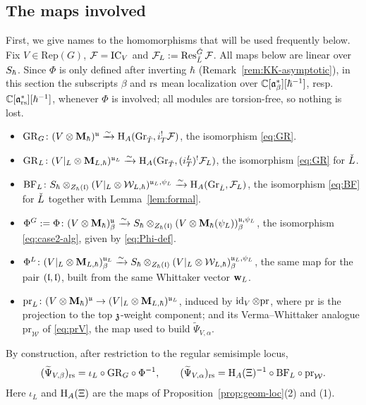 \documentclass{article}
\theoremstyle{plain}
\theoremstyle{definition}
\theoremstyle{remark}
\numberwithin{equation}{section}
\begin{document}
\subsection{The maps involved}\label{sec:cmp-maps}
First, we give names to the homomorphisms that will be used frequently below. Fix $V \in \mathrm{Rep}(G)$, $\mathcal{F}=\operatorname{IC}_V$ and $\mathcal{F}_L:=\operatorname{Res}^{{\check{G}}}_{\check{L}}\mathcal{F}$. All maps below are linear over $S_\hbar$. Since $\Phi$ is only defined after inverting $\hbar$ (Remark~\ref{rem:KK-asymptotic}), in this section the subscripts $\beta$ and $\mathrm{rs}$ mean localization over $\mathbb{C}[\mathfrak{a}^*_{\beta}][\hbar^{-1}]$, resp.\ $\mathbb{C}[\mathfrak{a}^*_{\mathrm{rs}}][\hbar^{-1}]$, whenever $\Phi$ is involved; all modules are torsion-free, so nothing is lost.
\begin{itemize}
\item $\mathrm{GR}_G\colon(V\otimes\mathbf{M}_\hbar)^{\mathfrak{u}}\xrightarrow{\sim}\mathrm{H}_A(\operatorname{Gr}_{{\check{T}}},i_T^!\mathcal{F})$, the isomorphism \eqref{eq:GR}.
\item $\mathrm{GR}_L\colon(V|_L\otimes\mathbf{M}_{L,\hbar})^{\mathfrak{u}_L}\xrightarrow{\sim}\mathrm{H}_A(\operatorname{Gr}_{{\check{T}}},(i^L_T)^!\mathcal{F}_L)$, the isomorphism \eqref{eq:GR} for $\check{L}$.
\item $\mathrm{BF}_L\colon S_\hbar\otimes_{Z_\hbar(\mathfrak{l})}(V|_L\otimes\mathcal{W}_{L,\hbar})^{\mathfrak{u}_L,\psi_L}\xrightarrow{\sim}\mathrm{H}_A(\operatorname{Gr}_{\check{L}},\mathcal{F}_L)$, the isomorphism \eqref{eq:BF} for $\check{L}$ together with Lemma~\ref{lem:formal}.
\item $\Phi^G:=\Phi\colon(V\otimes\mathbf{M}_\hbar)^{\mathfrak{u}}_\beta\xrightarrow{\sim}S_\hbar\otimes_{Z_\hbar(\mathfrak{l})}(V\otimes\mathbf{M}_\hbar(\psi_L))^{\mathfrak{u},\psi_L}_\beta$, the isomorphism \eqref{eq:case2-alg}, given by \eqref{eq:Phi-def}.
\item $\Phi^L\colon(V|_L\otimes\mathbf{M}_{L,\hbar})^{\mathfrak{u}_L}_\beta\xrightarrow{\sim}S_\hbar\otimes_{Z_\hbar(\mathfrak{l})}(V|_L\otimes\mathcal{W}_{L,\hbar})^{\mathfrak{u}_L,\psi_L}_\beta$, the same map for the pair $(\mathfrak{l},\mathfrak{l})$, built from the same Whittaker vector $\mathbf w_L$.
\item $\mathrm{pr}_L\colon(V\otimes\mathbf{M}_\hbar)^{\mathfrak{u}}\to(V|_L\otimes\mathbf{M}_{L,\hbar})^{\mathfrak{u}_L}$, induced by $\operatorname{id}_V\otimes\mathrm{pr}$, where $\mathrm{pr}$ is the projection to the top $\mathfrak{z}$-weight component; and its Verma--Whittaker analogue $\mathrm{pr}_{\mathcal{W}}$ of \eqref{eq:prV}, the map used to build $\widetilde\Psi_{V,\alpha}$.
\end{itemize}
By construction, after restriction to the regular semisimple locus,
\begin{equation}\label{eq:Psi-defs}
(\widetilde\Psi_{V,\beta})_{\mathrm{rs}}=\iota_L\circ\mathrm{GR}_G\circ\Phi^{-1},\qquad
(\widetilde\Psi_{V,\alpha})_{\mathrm{rs}}=\mathrm{H}_A(\Xi)^{-1}\circ\mathrm{BF}_L\circ\mathrm{pr}_{\mathcal{W}} .
\end{equation}
Here $\iota_L$ and $\mathrm{H}_A(\Xi)$ are the maps of Proposition~\ref{prop:geom-loc}(2) and (1).
\end{document}

